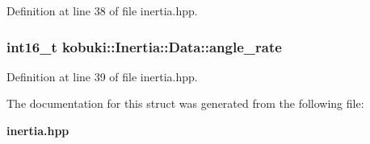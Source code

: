 \-Definition at line 38 of file inertia.\-hpp.

\subsubsection[{angle\-\_\-rate}]{\setlength{\rightskip}{0pt plus 5cm}int16\-\_\-t {\bf kobuki\-::\-Inertia\-::\-Data\-::angle\-\_\-rate}}\label{structkobuki_1_1Inertia_1_1Data_af44f592fb74158c5bcf5b275c67fc3b4}


\-Definition at line 39 of file inertia.\-hpp.



\-The documentation for this struct was generated from the following file\-:\begin{DoxyCompactItemize}
\item 
{\bf inertia.\-hpp}\end{DoxyCompactItemize}
